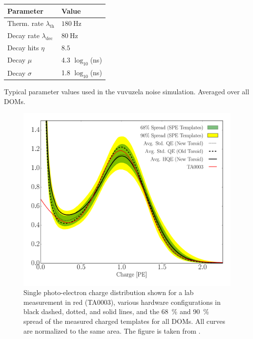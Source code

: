 \begin{margintable}
\small
    \begin{tabular}{ ll }
    \hline\hline

    \textbf{Parameter} & \textbf{Value} \\ 

    \hline\hline

    Therm. rate $\lambda_\mathrm{th}$ & $\SI{180}{\hertz}$ \\
    Decay rate $\lambda_\mathrm{dec}$ & $\SI{80}{\hertz}$ \\
    Decay hits $\eta$ &  $8.5$ \\
    Decay $\mu$ & 4.3 $\log_{10}$(\si{\nano\second}) \\
    Decay $\sigma$ & 1.8 $\log_{10}$(\si{\nano\second}) \\

    \hline
    \end{tabular}
\caption[Vuvuzela noise simulation parameters]{Typical parameter values used in the vuvuzela noise simulation. Averaged over all DOMs.}
\end{margintable}

\begin{figure}[h]
    \includegraphics[width=.9\textwidth]{figures/simulation_and_processing/SPE_TA003_2.pdf}
	\caption[Single photo-electron charge distribution]{Single photo-electron charge distribution shown for a lab measurement in red (TA0003), various hardware configurations in black dashed, dotted, and solid lines, and the \SI{68}{\percent} and \SI{90}{\percent} spread of the measured charged templates for all DOMs. All curves are normalized to the same area. The figure is taken from \cite{spe_respose_pmt}.}
\end{figure}

